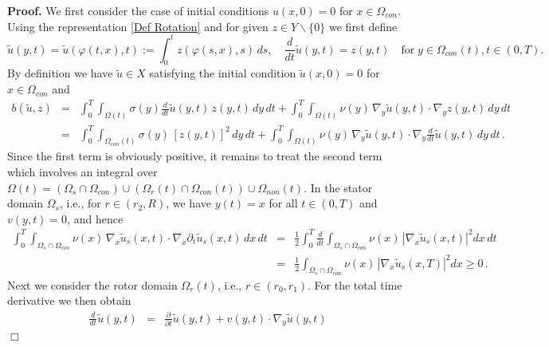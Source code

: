 \documentclass[12pt]{article}
\newenvironment{proof}{\textbf{Proof.}}{\hfill $\Box$}
\numberwithin{equation}{section}
\begin{document}
\begin{proof}
  We first consider the case of initial conditions $u(x,0)=0$ for
  $x \in \Omega_{con}$. Using the representation \eqref{Def Rotation}
  and for given $z \in Y \backslash \{ 0 \}$ we first define
  \[
    \widetilde{u}(y,t) =
    \widetilde{u}(\varphi(t,x),t) :=
    \int_0^t z(\varphi(s,x),s) \, ds,
    \quad \frac{d}{dt} \widetilde{u}(y,t) = z(y,t) \quad \mbox{for} \;
    y \in \Omega_{con}(t), t \in (0,T).
  \]
  By definition we have $\widetilde{u} \in X$ satisfying the initial
  condition $\widetilde{u}(x,0)=0$ for $x \in \Omega_{con}$ and
  \begin{eqnarray*}
    b(\widetilde{u},z)
    & = & \int_0^T \int_{\Omega(t)} \sigma(y)
        \frac{d}{dt} \widetilde{u}(y,t) \,
          z(y,t) \,
          dy \, dt
          + \int_0^T \int_{\Omega(t)} \nu(y) \, \nabla_y
        \widetilde{u}(y,t) \cdot \nabla_y
          z(y,t) \, dy \, dt \\
    & = &  
        \int_0^T \int_{\Omega_{con}(t)} \sigma(y) \,
          [z(y,t)]^2 \, dy \, dt +
        \int_0^T \int_{\Omega(t)}
        \nu(y) \, \nabla_y
          \widetilde{u}(y,t) \cdot
          \nabla_y \frac{d}{dt}
          \widetilde{u}(y,t) \,
        dy \, dt \, .
  \end{eqnarray*}
  Since the first term is obviously positive, it remains to treat the
  second term which involves an integral over
  $\Omega(t) = (\Omega_s \cap \Omega_{con}) \cup
  (\Omega_r(t) \cap \Omega_{con}(t)) \cup \Omega_{non}(t)$.
  In the stator domain $\Omega_s$, i.e., for $ r \in (r_2,R)$,
  we have $y(t) = x$ for all $t \in (0,T)$ and
  $v(y,t)=0$, and hence
  \begin{eqnarray*}
    \int_0^T \int_{\Omega_s \cap\Omega_{con}} \nu(x) \, \nabla_x
    \widetilde{u}_s(x,t) \cdot \nabla_x \partial_t
    \widetilde{u}_s(x,t) \, dx \, dt
    & = & \frac{1}{2} \int_0^T \frac{d}{dt} \int_{\Omega_s \cap\Omega_{con}}
          \nu(x) \, |\nabla_x \widetilde{u}_s(x,t)|^2 dx \,dt \\
    & = & \frac{1}{2} \int_{\Omega_s \cap\Omega_{con}} \nu(x) \,
        |\nabla_x \widetilde{u}_s(x,T)|^2 dx \geq 0 \, .
  \end{eqnarray*}
  Next we consider the rotor domain $\Omega_r(t)$, i.e., $r \in (r_0,r_1)$.
  For the total time derivative we then obtain
  \begin{eqnarray*}
    \frac{d}{dt} \widetilde{u}(y,t)
    & = & \frac{\partial}{\partial t} \widetilde{u}(y,t) +
          v(y,t)  \cdot
          \nabla_y \widetilde{u}(y,t) \\

\end{eqnarray*}
\end{proof}
\end{document}
